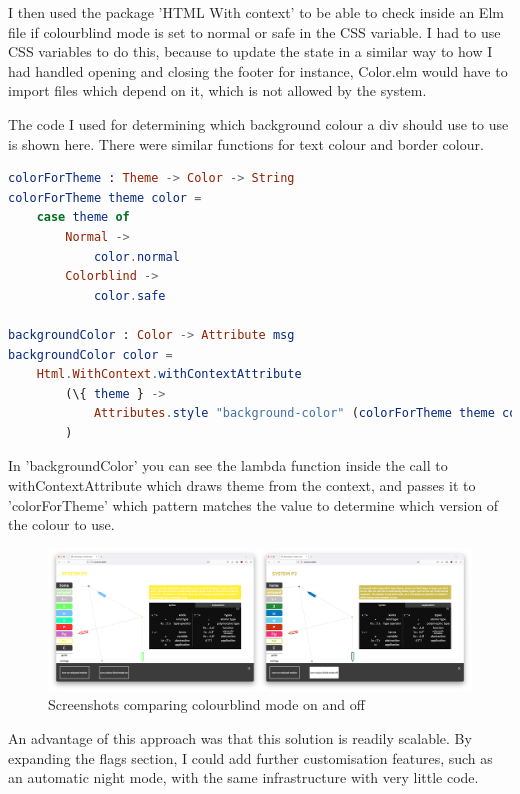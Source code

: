 \documentclass{l4proj}
\begin{document}
I then used the package 'HTML With context' to be able to check inside an Elm file if colourblind mode is set to normal or safe in the CSS variable.  I had to use CSS variables to do this, because to update the state in a similar way to how I had handled opening and closing the footer for instance, Color.elm would have to import files which depend on it, which is not allowed by the system.

The code I used for determining which background colour a div should use to use is shown here.  There were similar functions for text colour and border colour.

\begin{lstlisting}[language = Elm]
colorForTheme : Theme -> Color -> String
colorForTheme theme color =
    case theme of
        Normal ->
            color.normal
        Colorblind ->
            color.safe

backgroundColor : Color -> Attribute msg
backgroundColor color =
    Html.WithContext.withContextAttribute
        (\{ theme } ->
            Attributes.style "background-color" (colorForTheme theme color)
        )
\end{lstlisting}

In 'backgroundColor' you can see the lambda function inside the call to withContextAttribute which draws theme from the context, and passes it to 'colorForTheme' which pattern matches the value to determine which version of the colour to use.

\begin{figure}[h!]
    \centering
    \includegraphics[width=1\linewidth]{dissertation/images/colourbind_collage.png}
    \caption{Screenshots comparing colourblind mode on and off}
    \label{fig:enter-label}
\end{figure}    

An advantage of this approach was that this solution is readily scalable.  By expanding the flags section, I could add further customisation features, such as an automatic night mode, with the same infrastructure with very little code.
\end{document}
